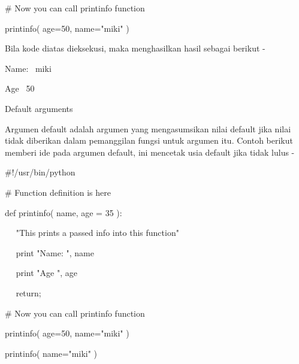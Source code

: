 \noindent 
 \hspace*{0.5in}  $  \#  $ Now you can call printinfo function \par
\noindent 
 \hspace*{0.5in} printinfo( age=50, name="miki" ) \par
\noindent 
Bila kode diatas dieksekusi, maka menghasilkan hasil sebagai berikut - \par
\noindent 
 \hspace*{0.5in} Name:~ miki \par
\noindent 
 \hspace*{0.5in} Age~ 50 \par
\vspace{12pt}
\noindent 
Default arguments \par
\noindent 
Argumen default adalah argumen yang mengasumsikan nilai default jika nilai tidak diberikan dalam pemanggilan fungsi untuk argumen itu. Contoh berikut memberi ide pada argumen default, ini mencetak usia default jika tidak lulus - \par
\noindent 
 \hspace*{0.5in}  $  \#  $!/usr/bin/python \par
\vspace{12pt}
\noindent 
 \hspace*{0.5in}  $  \#  $ Function definition is here \par
\noindent 
 \hspace*{0.5in} def printinfo( name, age = 35 ): \par
\noindent 
 \hspace*{0.5in} ~~ "This prints a passed info into this function" \par
\noindent 
 \hspace*{0.5in} ~~ print "Name: ", name \par
\noindent 
 \hspace*{0.5in} ~~ print "Age ", age \par
\noindent 
 \hspace*{0.5in} ~~ return; \par
\vspace{12pt}
\noindent 
 \hspace*{0.5in}  $  \#  $ Now you can call printinfo function \par
\noindent 
 \hspace*{0.5in} printinfo( age=50, name="miki" ) \par
\noindent 
 \hspace*{0.5in} printinfo( name="miki" ) \par
